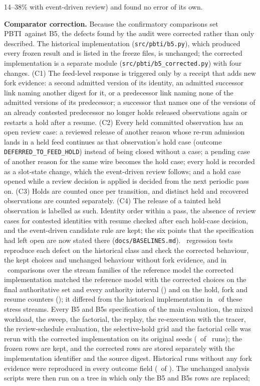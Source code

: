 \documentclass[10pt,a4paper]{article}
\newcommand{\sys}{PBTI}
\begin{document}
14--38\% with event-driven review) and found no error of its own.

\noindent\textbf{Comparator correction.} Because the confirmatory comparisons set \sys\ against B5, the defects found by the audit were corrected rather than only described. The historical implementation (\texttt{src/\allowbreak{}pbti/\allowbreak{}b5.py}), which produced every frozen result and is listed in the freeze files, is unchanged; the corrected implementation is a separate module (\texttt{src/\allowbreak{}pbti/\allowbreak{}b5\_\allowbreak{}corrected.py}) with four changes. (C1) The feed-level response is triggered only by a receipt that adds new fork evidence: a second admitted version of its identity, an admitted successor link naming another digest for it, or a predecessor link naming none of the admitted versions of its predecessor; a successor that names one of the versions of an already contested predecessor no longer holds released observations again or restarts a hold after a resume. (C2) Every held committed observation has an open review case: a reviewed release of another reason whose re-run admission lands in a held feed continues as that observation's hold case (outcome \texttt{DEFERRED\_\allowbreak{}TO\_\allowbreak{}FEED\_\allowbreak{}HOLD}) instead of being closed without a case; a pending case of another reason for the same wire becomes the hold case; every hold is recorded as a slot-state change, which the event-driven review follows; and a hold case opened while a review decision is applied is decided from the next periodic pass on. (C3) Holds are counted once per transition, and distinct held and recovered observations are counted separately. (C4) The release of a tainted held observation is labelled as such. Identity order within a pass, the absence of review cases for contested identities with resume checked after each hold-case decision, and the event-driven candidate rule are kept; the six points that the specification had left open are now stated there (\texttt{docs/\allowbreak{}BASELINES.md}). \YRegTests\ regression tests reproduce each defect on the historical class and check the corrected behaviour, the kept choices and unchanged behaviour without fork evidence, and in \YRefN\ comparisons over the stream families of the reference model the corrected implementation matched the reference model with the corrected choices on the final authoritative set and every authority interval (\YRefEqual) and on the hold, fork and resume counters (\YRefCounters); it differed from the historical implementation in \YRefHistDiffers\ of these stress streams. Every B5 and B5s specification of the main evaluation, the mixed workload, the sweep, the factorial, the replay, the re-execution with the tracer, the review-schedule evaluation, the selective-hold grid and the factorial cells was rerun with the corrected implementation on its original seeds (\YRunsRerun\ of \YRunsAll\ runs); the frozen rows are kept, and the corrected rows are stored separately with the implementation identifier and the source digest. Historical runs without any fork evidence were reproduced in every outcome field (\YRowsNoforkIdentical\ of \YRowsNofork). The unchanged analysis scripts were then run on a tree in which only the B5 and B5s rows are replaced; 
\end{document}
